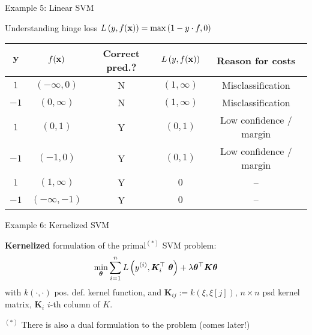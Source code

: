 \documentclass[11pt,compress,t,notes=noshow, xcolor=table]{beamer}
\begin{document}
\begin{framei}[fs=small]{Example 5: Linear SVM}
\item Understanding hinge loss $L\left(y, f(\mathbf{x})\right) = \max\left(1 - y\cdot f, 0\right)$
\item[] \begin{tabular}{ c | c | c | c | c }
$\mathbf{y}$ & $f(\mathbf{x})$ &  \textbf{Correct pred.?}  & $L\left(y, f(\mathbf{x})\right)$ & \textbf{Reason for costs}  \\ \hline
 $1$ & $(- \infty, 0)$  & N & $(1, \infty)$ & Misclassification \\
 $- 1$ & $(0, \infty)$ & N  & $(1, \infty)$ &  Misclassification \\
 $1$ & $(0, 1)$ & Y & $(0, 1)$ & Low confidence / margin \\
 $- 1$ & $(-1, 0)$  & Y  & $(0, 1)$& Low confidence / margin\\
 $1$ & $(1, \infty)$ &  Y & $0$ & -- \\
 $- 1$ & $(- \infty, -1)$ &  Y & $0$ & -- \\
\end{tabular}
\vfill
{}
\end{framei}


\begin{framei}{Example 6: Kernelized SVM}
\item \textbf{Kernelized} formulation of the primal$^{(*)}$ SVM problem:
$$ \min_{\bm{\theta}}\sum\limits_{i=1}^n L\left(y^{(i)}, \bm{K}_i^\top ~\bm{\theta}\right) + \lambda \bm{\theta}^\top \bm{K} \bm{\theta} $$
with $k(\cdot, \cdot)$ pos. def. kernel function, and $\bm{K}_{ij} := k(\xi, \xi[j])$, $n \times n$ psd kernel matrix, $\bm{K}_i$ $i$-th column of $K$.
\vfill
{} \spacer
\begin{small}
\item[] $^{(*)}$ There is also a dual formulation to the problem (comes later!)
\end{small}
\end{framei}
\end{document}
